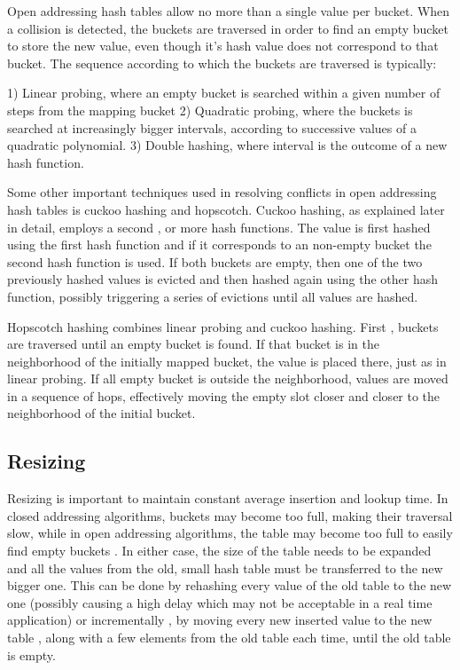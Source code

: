 Open addressing hash tables allow no more than a single value per bucket. When a collision is detected, the buckets are traversed in order to find an empty bucket to store the new value, even though it’s hash value does not correspond to that bucket. The sequence according to which the buckets are traversed is typically:

1) Linear probing, where an empty bucket is searched within a given number of steps from the mapping bucket
2) Quadratic probing, where the buckets is searched at increasingly bigger intervals, according to successive values of a quadratic polynomial. 
3) Double hashing, where interval is the outcome of a new hash function.


 Some other important techniques used in resolving conflicts in open addressing hash tables is cuckoo hashing and hopscotch. Cuckoo hashing, as explained later in detail, employs a second , or more hash functions. The value is first hashed using the first hash function  and if it corresponds to an non-empty bucket the second hash function is used. If both buckets are empty, then one of the two previously hashed values is evicted and then hashed again using the other hash function, possibly triggering a series of evictions until all values are hashed.


Hopscotch hashing combines linear probing and cuckoo hashing. First , buckets are traversed until an empty bucket is found. If that bucket is in the neighborhood of the initially mapped bucket, the value is placed there, just as in linear probing. If all empty bucket is outside the neighborhood, values are moved in a sequence of hops, effectively moving the empty slot closer and closer to the neighborhood of the initial bucket.


\subsection{Resizing}

Resizing is important to maintain constant average insertion and lookup time. In closed addressing algorithms, buckets may become too full, making their traversal slow, while in open addressing algorithms, the table may become too full to easily  find empty buckets . In either case, the size of the table needs to be expanded and all the values from the old, small hash table must be transferred to the new bigger one. This can be done by rehashing every value of the old table to the new one (possibly causing a high delay which may not be acceptable in a real time application) or  incrementally , by moving every new inserted value to the new table , along with a few elements from the old table each time, until the old table is empty.


